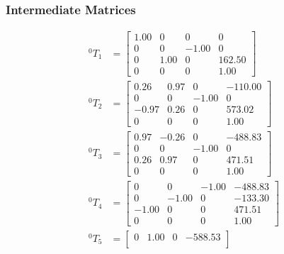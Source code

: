 \subsubsection{Intermediate Matrices}
\begin{equation*}
    \begin{split}
        ^{0}T_{1} & = \begin{bmatrix}
                          1.00 & 0    & 0     & 0      \\
                          0    & 0    & -1.00 & 0      \\
                          0    & 1.00 & 0     & 162.50 \\
                          0    & 0    & 0     & 1.00
                      \end{bmatrix}    \\
        ^{0}T_{2} & = \begin{bmatrix}
                          0.26  & 0.97 & 0     & -110.00 \\
                          0     & 0    & -1.00 & 0       \\
                          -0.97 & 0.26 & 0     & 573.02  \\
                          0     & 0    & 0     & 1.00
                      \end{bmatrix}  \\
        ^{0}T_{3} & = \begin{bmatrix}
                          0.97 & -0.26 & 0     & -488.83 \\
                          0    & 0     & -1.00 & 0       \\
                          0.26 & 0.97  & 0     & 471.51  \\
                          0    & 0     & 0     & 1.00
                      \end{bmatrix}  \\
        ^{0}T_{4} & = \begin{bmatrix}
                          0     & 0     & -1.00 & -488.83 \\
                          0     & -1.00 & 0     & -133.30 \\
                          -1.00 & 0     & 0     & 471.51  \\
                          0     & 0     & 0     & 1.00
                      \end{bmatrix} \\
        ^{0}T_{5} & = \begin{bmatrix}
                          0    & 1.00 & 0     & -588.53 \\

\end{bmatrix}
\end{split}
\end{equation*}
